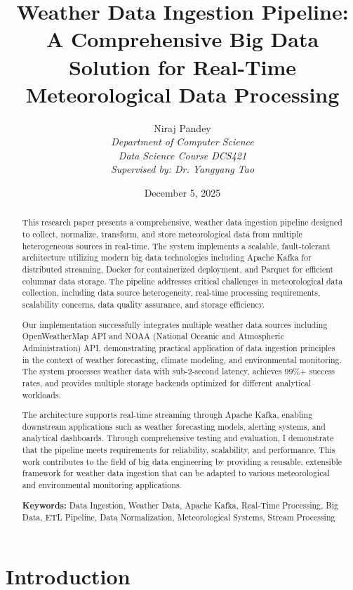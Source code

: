 \documentclass[12pt,a4paper]{article}
\title{\textbf{Weather Data Ingestion Pipeline: A Comprehensive Big Data Solution for Real-Time Meteorological Data Processing}}
\author{
    Niraj Pandey\\
    \textit{Department of Computer Science}\\
    \textit{Data Science Course DCS421}\\
    \textit{Supervised by: Dr. Yangyang Tao}
}
\date{December 5, 2025}
\begin{document}
\maketitle

\begin{abstract}
\noindent
This research paper presents a comprehensive, weather data ingestion pipeline designed to collect, normalize, transform, and store meteorological data from multiple heterogeneous sources in real-time. The system implements a scalable, fault-tolerant architecture utilizing modern big data technologies including Apache Kafka for distributed streaming, Docker for containerized deployment, and Parquet for efficient columnar data storage. The pipeline addresses critical challenges in meteorological data collection, including data source heterogeneity, real-time processing requirements, scalability concerns, data quality assurance, and storage efficiency. 

Our implementation successfully integrates multiple weather data sources including OpenWeatherMap API and NOAA (National Oceanic and Atmospheric Administration) API, demonstrating practical application of data ingestion principles in the context of weather forecasting, climate modeling, and environmental monitoring. The system processes weather data with sub-2-second latency, achieves 99\%+ success rates, and provides multiple storage backends optimized for different analytical workloads. 

The architecture supports real-time streaming through Apache Kafka, enabling downstream applications such as weather forecasting models, alerting systems, and analytical dashboards. Through comprehensive testing and evaluation, I demonstrate that the pipeline meets requirements for reliability, scalability, and performance. This work contributes to the field of big data engineering by providing a reusable, extensible framework for weather data ingestion that can be adapted to various meteorological and environmental monitoring applications.

\textbf{Keywords:} Data Ingestion, Weather Data, Apache Kafka, Real-Time Processing, Big Data, ETL Pipeline, Data Normalization, Meteorological Systems, Stream Processing
\end{abstract}

\newpage
\section{Introduction}
\end{document}
